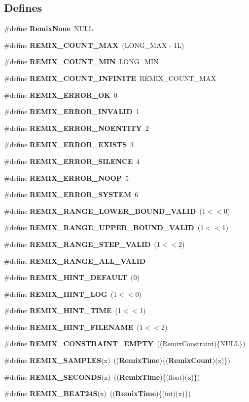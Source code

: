 \subsection*{Defines}
\begin{DoxyCompactItemize}
\item 
\#define {\bf RemixNone}~NULL
\item 
\#define {\bf REMIX\_\-COUNT\_\-MAX}~(LONG\_\-MAX -\/ 1L)
\item 
\#define {\bf REMIX\_\-COUNT\_\-MIN}~LONG\_\-MIN
\item 
\#define {\bf REMIX\_\-COUNT\_\-INFINITE}~REMIX\_\-COUNT\_\-MAX
\item 
\#define {\bf REMIX\_\-ERROR\_\-OK}~0
\item 
\#define {\bf REMIX\_\-ERROR\_\-INVALID}~1
\item 
\#define {\bf REMIX\_\-ERROR\_\-NOENTITY}~2
\item 
\#define {\bf REMIX\_\-ERROR\_\-EXISTS}~3
\item 
\#define {\bf REMIX\_\-ERROR\_\-SILENCE}~4
\item 
\#define {\bf REMIX\_\-ERROR\_\-NOOP}~5
\item 
\#define {\bf REMIX\_\-ERROR\_\-SYSTEM}~6
\item 
\#define {\bf REMIX\_\-RANGE\_\-LOWER\_\-BOUND\_\-VALID}~(1$<$$<$0)
\item 
\#define {\bf REMIX\_\-RANGE\_\-UPPER\_\-BOUND\_\-VALID}~(1$<$$<$1)
\item 
\#define {\bf REMIX\_\-RANGE\_\-STEP\_\-VALID}~(1$<$$<$2)
\item 
\#define {\bf REMIX\_\-RANGE\_\-ALL\_\-VALID}
\item 
\#define {\bf REMIX\_\-HINT\_\-DEFAULT}~(0)
\item 
\#define {\bf REMIX\_\-HINT\_\-LOG}~(1$<$$<$0)
\item 
\#define {\bf REMIX\_\-HINT\_\-TIME}~(1$<$$<$1)
\item 
\#define {\bf REMIX\_\-HINT\_\-FILENAME}~(1$<$$<$2)
\item 
\#define {\bf REMIX\_\-CONSTRAINT\_\-EMPTY}~((RemixConstraint)\{NULL\})
\item 
\#define {\bf REMIX\_\-SAMPLES}(x)~(({\bf RemixTime})\{({\bf RemixCount})(x)\})
\item 
\#define {\bf REMIX\_\-SECONDS}(x)~(({\bf RemixTime})\{(float)(x)\})
\item 
\#define {\bf REMIX\_\-BEAT24S}(x)~(({\bf RemixTime})\{(int)(x)\})
\end{DoxyCompactItemize}

